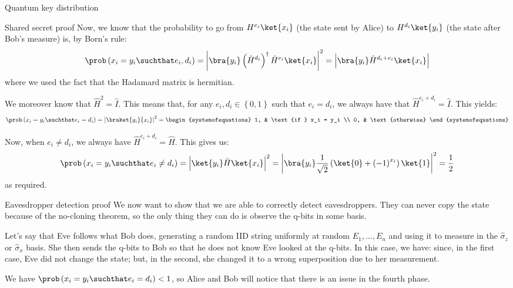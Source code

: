 \documentclass[a4paper]{article}
\begin{document}
\begin{parag}{Quantum key distribution}
\begin{subparag}{Shared secret proof}
        Now, we know that the probability to go from $H^{e_i} \ket{x_i}$ (the state sent by Alice) to $H^{d_i}\ket{y_i}$ (the state after Bob's measure) is, by Born's rule: 
        \[\prob\left(x_i = y_i \suchthat e_i, d_i\right) = \left|\bra{y_i} \left(\hat{H}^{d_i}\right)^{\dagger} \hat{H}^{e_i} \ket{x_i}\right|^2 = \left|\bra{y_i} \hat{H}^{d_i + e_i} \ket{x_i}\right| \]
        where we used the fact that the Hadamard matrix is hermitian.

        We moreover know that $\hat{H}^2 = \hat{I}$. This means that, for any $e_i, d_i \in \left\{0, 1\right\}$ such that $e_i = d_i$, we always have that $\hat{H}^{e_i + d_i} = \hat{I}$. This yields: 
        \[\prob\left(x_i = y_i \suchthat e_i = d_i\right) = \left|\braket{y_i}{x_i}\right|^2 = \begin{systemofequations} 1, & \text{if } x_i = y_i \\ 0, & \text{otherwise} \end{systemofequations}\]
        
        Now, when $e_i \neq d_i$, we always have $\hat{H}^{e_i + d_i} = \hat{H}$. This gives us: 
        \[\prob\left(x_i = y_i \suchthat e_i \neq d_i\right) = \left|\ket{y_i}\hat{H}\ket{x_i}\right|^2 = \left|\bra{y_i} \frac{1}{\sqrt{2}}\left(\ket{0} + \left(-1\right)^{x_i}\right)\ket{1}\right|^2 = \frac{1}{2}\]
        as required.
    \end{subparag}

    \begin{subparag}{Eavesdropper detection proof}
        We now want to show that we are able to correctly detect eavesdroppers. They can never copy the state because of the no-cloning theorem, so the only thing they can do is observe the q-bits in some basis. 

        Let's say that Eve follows what Bob does, generating a random IID string uniformly at random $E_1, \ldots, E_n$ and using it to measure in the $\hat{\sigma}_z$ or $\hat{\sigma}_x$ basis. She then sends the q-bits to Bob so that he does not know Eve looked at the q-bits. In this case, we have: 
        since, in the first case, Eve did not change the state; but, in the second, she changed it to a wrong superposition due to her measurement. 

        We have $\prob\left(x_i = y_i \suchthat e_i = d_i\right) < 1$, so Alice and Bob will notice that there is an issue in the fourth phase.
    \end{subparag}
\end{parag}
\end{document}
